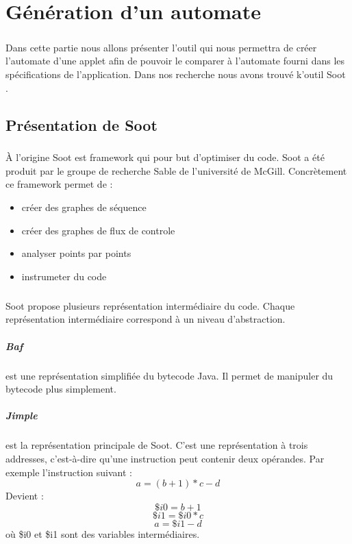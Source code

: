 \chapter{Génération d'un automate}

\paragraph{}
Dans cette partie nous allons présenter l'outil qui nous permettra de créer l'automate d'une applet afin de pouvoir le comparer à l'automate fourni dans les spécifications de l'application. Dans nos recherche nous avons trouvé k'outil Soot \cite{Soot}.

\section{Présentation de Soot}

\paragraph{}
À l'origine Soot est framework qui pour but d'optimiser du code. Soot a été produit par le groupe de recherche Sable de l'université de McGill. Concrètement ce framework permet de :

\begin{itemize}
	\item créer des graphes de séquence
	\item créer des graphes de flux de controle
	\item analyser points par points
	\item instrumeter du code
\end{itemize}

\paragraph{}
Soot propose plusieurs représentation intermédiaire du code. Chaque représentation intermédiaire correspond à un niveau d'abstraction.

\paragraph{Baf} est une représentation simplifiée du bytecode Java. Il permet de manipuler du bytecode plus simplement.
\paragraph{Jimple} est la représentation principale de Soot. C'est une représentation à trois addresses, c'est-à-dire qu'une instruction peut contenir deux opérandes. Par exemple l'instruction suivant : 
$$ a = (b + 1) * c - d$$
Devient : 
$$ \$i0 = b + 1$$
$$ \$i1 = \$i0 * c$$
$$ a = \$i1 - d$$
où \$i0 et \$i1 sont des variables intermédiaires.


